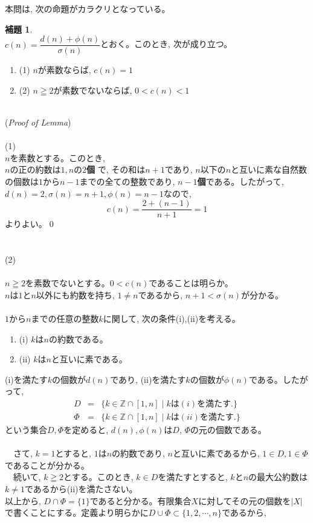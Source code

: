 \documentclass[twocolumn]{jbook}
\theoremstyle{definition}
\newtheorem{lem}[theo]{補題}
\newcommand{\ben}{\begin{enumerate}}
\newcommand{\een}{\end{enumerate}}
\newcommand{\beqn}{\begin{eqnarray*}}
\newcommand{\eeqn}{\end{eqnarray*}}
\newcommand{\mb}{\mathbb}
\renewcommand{\geq}{\geqq}
\begin{document}
本問は, 次の命題がカラクリとなっている。
\begin{lem}　\\
$c(n) = \dfrac{d(n) + \phi(n)}{\sigma(n)}$とおく。このとき, 次が成り立つ。
\ben
\item[(1)] $n$が素数ならば, $c(n) = 1$
\item[(2)] $n\geq 2$が素数でないならば, $0<c(n) < 1$
\een
\end{lem}　\\
({\it Proof of Lemma})\\
\\
{\LARGE (1)}\\
$n$を素数とする。このとき,\\
$n$の正の約数は$1,n$の{\bf $2$個} で, その和は$n+1$であり, $n$以下の$n$と互いに素な自然数の個数は$1$から$n-1$までの全ての整数であり, {\bf $n-1$個}である。したがって, $d(n) = 2, \sigma(n)=n+1, \phi(n) = n-1$なので, 
\[c(n) = \dfrac{2+ (n-1)}{n+1} = 1\]
よりよい。\qed\\
\\
\\
{\LARGE (2)}\\
\\
$n\geq 2$を素数でないとする。$0<c(n)$であることは明らか。\\
$n$は$1$と$n$以外にも約数を持ち, $1\neq n$であるから, $n+1< \sigma(n) $が分かる。\\
\\
$1$から$n$までの任意の整数$k$に関して, 次の条件(i),(ii)を考える。
\ben
\item[(i)] $k$は$n$の約数である。
\item[(ii)] $k$は$n$と互いに素である。
\een
(i)を満たす$k$の個数が$d(n)$であり, (ii)を満たす$k$の個数が$\phi(n)$である。したがって, 
\beqn
D &=& \{ k\in \mb{Z}\cap [1,n]\mid kは(i)を満たす.\}\\
\Phi &=& \{ k\in \mb{Z}\cap [1,n] \mid kは(ii)を満たす. \}
\eeqn
という集合$D,\Phi$を定めると, $d(n),\phi(n)$は$D$, $\Phi$の元の個数である。\\
\\
　さて, $k=1$とすると, $1$は$n$の約数であり, $n$と互いに素であるから, $1\in D, 1\in \Phi$であることが分かる。\\
　続いて, $k\geq 2$とする。このとき, $k\in D$を満たすとすると, $k$と$n$の最大公約数は$k\neq 1$であるから(ii)を満たさない。\\
以上から, $D\cap \Phi = \{ 1 \}$であると分かる。有限集合$X$に対してその元の個数を$|X|$で書くことにする。定義より明らかに$D\cup \Phi \subset \{ 1,2,\cdots, n\}$であるから, 
\end{document}
